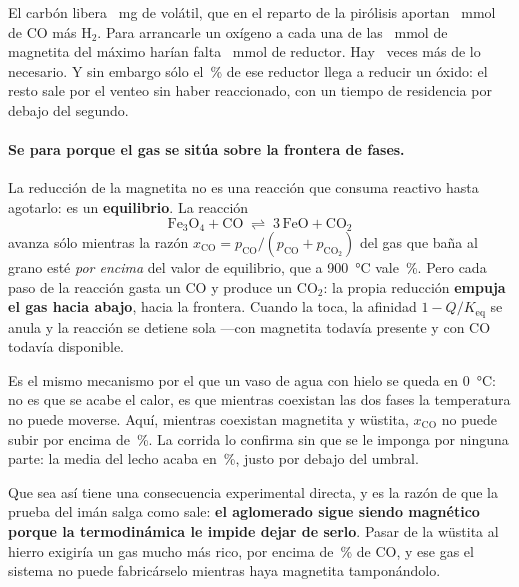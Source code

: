 El carbón libera \datVolatilLiberado\ \si{\milli\gram} de volátil, que en el
reparto de la pirólisis aportan \datReductorGenerado\ \si{\milli\mol} de
CO más H$_2$. Para arrancarle un oxígeno a cada una de las
\datMagnetitaPico\ \si{\milli\mol} de magnetita del máximo harían falta
\datMagnetitaPico\ \si{\milli\mol} de reductor. Hay \datReductorExceso\ veces
más de lo necesario. Y sin embargo sólo el \datReductorAprovechado\,\% de ese
reductor llega a reducir un óxido: el resto sale por el venteo sin haber
reaccionado, con un tiempo de residencia por debajo del segundo.

\paragraph{Se para porque el gas se sitúa sobre la frontera de fases.} La
reducción de la magnetita no es una reacción que consuma reactivo hasta
agotarlo: es un \textbf{equilibrio}. La reacción
\begin{equation}
  \mathrm{Fe_3O_4} + \mathrm{CO} \;\rightleftharpoons\;
  3\,\mathrm{FeO} + \mathrm{CO_2}
\end{equation}
avanza sólo mientras la razón $x_\mathrm{CO} = p_\mathrm{CO} / (p_\mathrm{CO} +
p_\mathrm{CO_2})$ del gas que baña al grano esté \emph{por encima} del valor de
equilibrio, que a \SI{900}{\celsius} vale \datUmbralMagnetita{}\,\%. Pero cada
paso de la reacción gasta un CO y produce un CO$_2$: la propia reducción
\textbf{empuja el gas hacia abajo}, hacia la frontera. Cuando la toca, la
afinidad $1 - Q/K_\mathrm{eq}$ se anula y la reacción se detiene sola ---con
magnetita todavía presente y con CO todavía disponible.

Es el mismo mecanismo por el que un vaso de agua con hielo se queda en
\SI{0}{\celsius}: no es que se acabe el calor, es que mientras coexistan las dos
fases la temperatura no puede moverse. Aquí, mientras coexistan magnetita y
wüstita, $x_\mathrm{CO}$ no puede subir por encima de
\datUmbralMagnetita{}\,\%. La corrida lo confirma sin que se le imponga por
ninguna parte: la media del lecho acaba en \datCOLechoFinal{}\,\%, justo por
debajo del umbral.

Que sea así tiene una consecuencia experimental directa, y es la razón de que
la prueba del imán salga como sale: \textbf{el aglomerado sigue siendo
magnético porque la termodinámica le impide dejar de serlo}. Pasar de la
wüstita al hierro exigiría un gas mucho más rico, por encima de
\datUmbralWustita{}\,\% de CO, y ese gas el sistema no puede fabricárselo
mientras haya magnetita tamponándolo.


